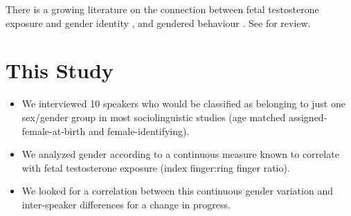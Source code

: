 \documentclass[a0,portrait]{a0poster}
\begin{document}
\begin{multicols}{2}
There is a growing literature on the connection between fetal testosterone exposure and gender identity \citep{hinesetal2004, berenbaumbailey2003}, and gendered behaviour \citep{hinesetal2002, auyeungetal2009}. See \citet{hines2006, balthazart2011} for review.


%
%




\section*{This Study}

\begin{itemize}
	\item We interviewed 10 speakers who would be classified as belonging to just one sex/gender group in most sociolinguistic studies (age matched assigned-female-at-birth and female-identifying).
	\item We analyzed gender according to a continuous measure known to correlate with fetal testosterone exposure (index finger:ring finger ratio).
	\item We looked for a correlation between this continuous gender variation and inter-speaker differences for a change in progress.
\end{itemize}


\end{multicols}
\end{document}
